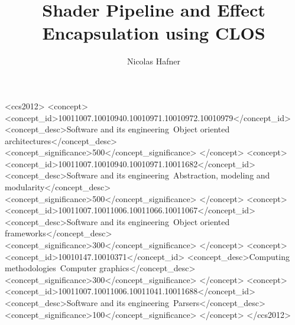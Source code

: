 \documentclass[format=sigconf]{acmart}
\begin{document}
\title{Shader Pipeline and Effect Encapsulation using CLOS}

\author{Nicolas Hafner}

\begin{abstract}
\end{abstract}

\begin{CCSXML}
  <ccs2012>
  <concept>
  <concept_id>10011007.10010940.10010971.10010972.10010979</concept_id>
  <concept_desc>Software and its engineering~Object oriented architectures</concept_desc>
  <concept_significance>500</concept_significance>
  </concept>
  <concept>
  <concept_id>10011007.10010940.10010971.10011682</concept_id>
  <concept_desc>Software and its engineering~Abstraction, modeling and modularity</concept_desc>
  <concept_significance>500</concept_significance>
  </concept>
  <concept>
  <concept_id>10011007.10011006.10011066.10011067</concept_id>
  <concept_desc>Software and its engineering~Object oriented frameworks</concept_desc>
  <concept_significance>300</concept_significance>
  </concept>
  <concept>
  <concept_id>10010147.10010371</concept_id>
  <concept_desc>Computing methodologies~Computer graphics</concept_desc>
  <concept_significance>300</concept_significance>
  </concept>
  <concept>
  <concept_id>10011007.10011006.10011041.10011688</concept_id>
  <concept_desc>Software and its engineering~Parsers</concept_desc>
  <concept_significance>100</concept_significance>
  </concept>
  </ccs2012>
\end{CCSXML}



\maketitle

\newpage

\def\abovecaptionskip{1pt}
\def\listingautorefname{listing}
\def\figureautorefname{figure}
\end{document}
